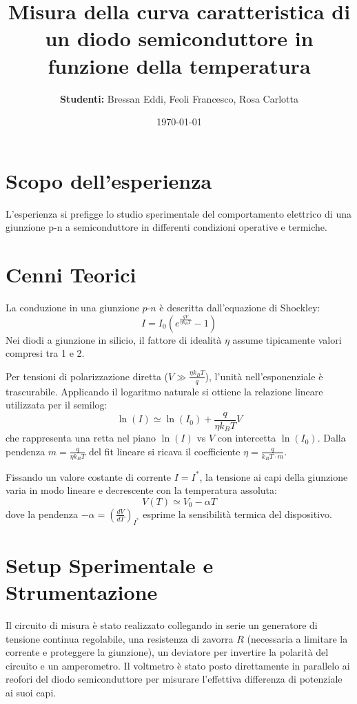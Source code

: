 \documentclass[a4paper,11pt]{article}
\title{\textbf{Misura della curva caratteristica di un diodo semiconduttore in funzione della temperatura}}
\author{\textbf{Studenti:} Bressan Eddi, Feoli Francesco, Rosa Carlotta}
\date{\today}
\begin{document}
\maketitle
\tableofcontents
\newpage

\section{Scopo dell'esperienza}
L'esperienza si prefigge lo studio sperimentale del comportamento elettrico di una giunzione p-n a semiconduttore in differenti condizioni operative e termiche.

\section{Cenni Teorici}
La conduzione in una giunzione $p\text{-}n$ è descritta dall'equazione di Shockley:
\begin{equation*}
    I = I_0 \left( e^{\frac{qV}{\eta k_B T}} - 1 \right)
\end{equation*}
Nei diodi a giunzione in silicio, il fattore di idealità $\eta$ assume tipicamente valori compresi tra 1 e 2.

Per tensioni di polarizzazione diretta ($V \gg \frac{\eta k_B T}{q}$), l'unità nell'esponenziale è trascurabile. Applicando il logaritmo naturale si ottiene la relazione lineare utilizzata per il semilog:
\begin{equation*}
    \ln(I) \simeq \ln(I_0) + \frac{q}{\eta k_B T} V
\end{equation*}
che rappresenta una retta nel piano $\ln(I)$ vs $V$ con intercetta $\ln(I_0)$. Dalla pendenza $m = \frac{q}{\eta k_B T}$ del fit lineare si ricava il coefficiente $\eta = \frac{q}{k_B T \cdot m}$.

Fissando un valore costante di corrente $I = I^*$, la tensione ai capi della giunzione varia in modo lineare e decrescente con la temperatura assoluta:
\begin{equation*}
    V(T) \simeq V_0 - \alpha T
\end{equation*}
dove la pendenza $-\alpha = \left( \frac{dV}{dT} \right)_{I^*}$ esprime la sensibilità termica del dispositivo.

\section{Setup Sperimentale e Strumentazione}

Il circuito di misura è stato realizzato collegando in serie un generatore di tensione continua regolabile, una resistenza di zavorra $R$ (necessaria a limitare la corrente e proteggere la giunzione), un deviatore per invertire la polarità del circuito e un amperometro. Il voltmetro è stato posto direttamente in parallelo ai reofori del diodo semiconduttore per misurare l'effettiva differenza di potenziale ai suoi capi.
\end{document}
